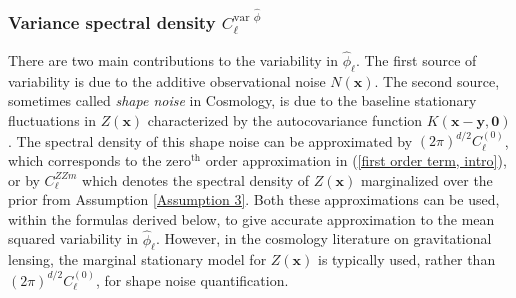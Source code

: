 \documentclass[10pt,noinfoline]{imsart}
\newcommand{\bs}{\boldsymbol}
\begin{document}
\subsubsection{Variance spectral density $C_{\bs \ell}^{\text{var }\hat\phi}$}
\label{SubSection: var}


There are two main contributions to the variability in $\hat\phi_{\bs\ell}$. The first source of variability is due to the   additive observational noise $N(\bs x)$. The second source, sometimes called \textit{shape noise} in Cosmology, is due to the baseline stationary fluctuations in $Z(\bs x)$ characterized by the autocovariance function $K(\bs x - \bs y, \bs 0)$.  The spectral density of this shape noise can be approximated by ${(2\pi)}^{d/2}C^{(0)}_{\bs \ell}$, which corresponds to the zero${}^\text{th}$ order approximation in (\ref{first order term, intro}), or by $C^{ZZm}_{\bs \ell}$ which denotes the  spectral density of $Z(\bs x)$ marginalized over the prior from Assumption \ref{Assumption 3}. Both these approximations can be used, within the formulas derived below, to give accurate approximation to the mean squared variability in $\hat\phi_{\bs \ell}$. However, in the cosmology literature on gravitational lensing, the marginal stationary model for $Z(\bs x)$ is typically used, rather than ${(2\pi)}^{d/2}C^{(0)}_{\bs \ell}$, for shape noise quantification.
\end{document}
